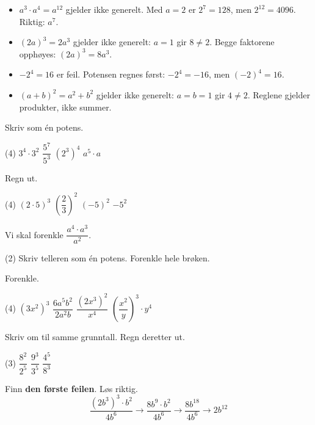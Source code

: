 \begin{vanligfeil}
\begin{itemize}[leftmargin=1.2em,itemsep=1pt,topsep=0pt]
  \item $a^3 \cdot a^4 = a^{12}$ gjelder ikke generelt. Med $a=2$ er $2^7=128$, men $2^{12}=4096$. Riktig: $a^7$.
  \item $(2a)^3 = 2a^3$ gjelder ikke generelt: $a=1$ gir $8\neq2$. Begge faktorene opphøyes: $(2a)^3 = 8a^3$.
  \item $-2^4 = 16$ er feil. Potensen regnes først: $-2^4 = -16$, men $(-2)^4 = 16$.
  \item $(a+b)^2 = a^2 + b^2$ gjelder ikke generelt: $a=b=1$ gir $4\neq2$. Reglene gjelder produkter, ikke summer.
\end{itemize}
\end{vanligfeil}


Skriv som én potens.
\begin{tasks}(4)
  \task $3^4 \cdot 3^2$
  \task $\dfrac{5^7}{5^3}$
  \task $(2^3)^4$
  \task $a^5 \cdot a$
\end{tasks}

Regn ut.
\begin{tasks}(4)
  \task $(2 \cdot 5)^3$
  \task $\left(\dfrac{2}{3}\right)^2$
  \task $(-5)^2$
  \task $-5^2$
\end{tasks}

Vi skal forenkle $\dfrac{a^4 \cdot a^3}{a^2}$.
\begin{tasks}(2)
  \task Skriv telleren som én potens.
  \task Forenkle hele brøken.
\end{tasks}


Forenkle.
\begin{tasks}(4)
  \task $(3x^2)^3$
  \task $\dfrac{6a^5b^2}{2a^2b}$
  \task $\dfrac{(2x^3)^2}{x^4}$
  \task $\left(\dfrac{x^2}{y}\right)^3 \cdot y^4$
\end{tasks}

Skriv om til samme grunntall. Regn deretter ut.
\begin{tasks}(3)
  \task $\dfrac{8^2}{2^5}$
  \task $\dfrac{9^3}{3^5}$
  \task $\dfrac{4^5}{8^3}$
\end{tasks}

Finn \textbf{den første feilen}. Løs riktig.
\[ \dfrac{(2b^3)^3\cdot b^2}{4b^6}\to\dfrac{8b^9\cdot b^2}{4b^6}\to\dfrac{8b^{18}}{4b^6}\to2b^{12} \]

